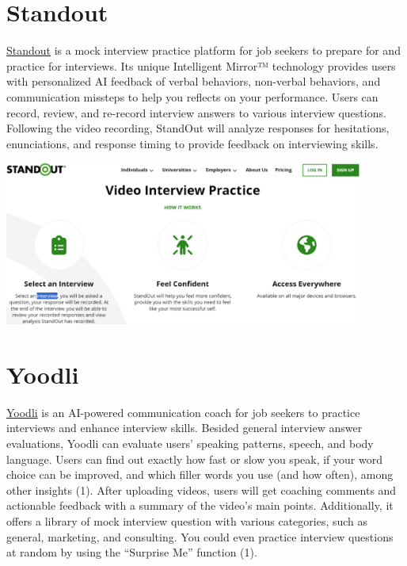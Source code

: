 \documentclass[
]{book}
\begin{document}
\hypertarget{standout}{%
\section{Standout}\label{standout}}

\href{https://standout.com/}{Standout} is a mock interview practice platform for job seekers to prepare for and practice for interviews. Its unique Intelligent Mirror™ technology provides users with personalized AI feedback of verbal behaviors, non-verbal behaviors, and communication missteps to help you reflects on your performance. Users can record, review, and re-record interview answers to various interview questions. Following the video recording, StandOut will analyze responses for hesitations, enunciations, and response timing to provide feedback on interviewing skills.

\includegraphics[width=4.64583in,height=\textheight]{standout pic.png}

\hypertarget{yoodli}{%
\section{Yoodli}\label{yoodli}}

\href{https://app.yoodli.ai/}{Yoodli} is an AI-powered communication coach for job seekers to practice interviews and enhance interview skills. Besided general interview answer evaluations, Yoodli can evaluate users' speaking patterns, speech, and body language. Users can find out exactly how fast or slow you speak, if your word choice can be improved, and which filler words you use (and how often), among other insights (1). After uploading videos, users will get coaching comments and actionable feedback with a summary of the video's main points. Additionally, it offers a library of mock interview question with various categories, such as general, marketing, and consulting. You could even practice interview questions at random by using the ``Surprise Me'' function (1).
\end{document}
